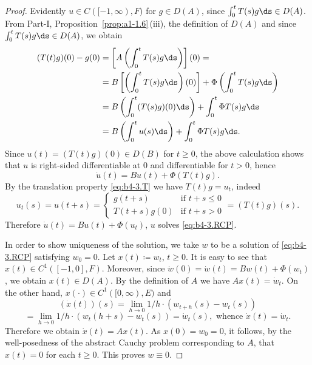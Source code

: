 \begin{proof} Evidently $u \in C([-1,\infty),F)$ for $g \in D(A)$,
since $\int_{0}^{t} T(s)g \ds  \in D(A)$.
From Part-I, Proposition~\ref{prop:a1-1.6}\,(iii), the definition of\/ $D(A)$ and since $\int_{0}^{t} T(s)g \ds  \in D(A)$, we obtain
\begin{align*}
	(T(t)g)(0) - g(0) &= \left[A\left(\int_{0}^{t} T(s)g  \ds \right)\right](0) = \\
	&= B\left[\left(\int_{0}^{t} T(s)g \ds\right)(0)\right] + \Phi\left(\int_{0}^{t} T(s)g \ds \right) \\
	&= B\left(\int_{0}^{t} (T(s)g)(0) \ds\right) + \int_{0}^{t} \Phi T(s)g \ds  \\
	&= B\left(\int_{0}^{t} u(s) \ds\right)  + \int_{0}^{t} \Phi T(s)g \ds .
\end{align*}
Since $u(t) = (T(t)g)(0) \in D(B)$ for $t \geq 0$, the above calculation shows that $u$ is right-sided differentiable at $0$ and differentiable for $t > 0$, hence
\[
\dot{u}(t) = Bu(t) + \Phi(T(t)g) .
\]
By the translation property \eqref{eq:b4-3.T} we have $T(t)g = u_t$, indeed
\[
u_t(s) = u(t+s) = 
\begin{cases}
	g(t+s) & \text{if } t+s \leq 0 \\
	T(t+s)g(0) & \text{if } t+s > 0
\end{cases}
= (T(t)g)(s) .
\]
Therefore $\dot{u}(t) = Bu(t) + \Phi(u_t)$, \ie $u$ solves \eqref{eq:b4-3.RCP}.

In order to show uniqueness of the solution, we take $w$ to be a solution of  \eqref{eq:b4-3.RCP} satisfying $w_{0} = 0$. 
Let $x(t) \coloneq  w_t$, $t \geq 0$. 
It is easy to see that $x(t) \in C^1([-1,0],F)$. Moreover, since $\dot{w}(0) = \dot{w}(t) = Bw(t) + \Phi(w_t)$, we obtain $x(t) \in D(A)$. 
By the definition of\/ $A$ we have $Ax(t) = \dot{w}_t$. 
On the other hand, $x(\cdot) \in C^1([0,\infty),E)$ and
\[
(\dot{x}(t))(s) = \lim_{h \to 0} 1/h \cdot (w_{t+h}(s) - w_t(s))
\]
\[
= \lim_{h \to 0} 1/h \cdot (w_t(h+s) - w_t(s)) = \dot{w}_t(s), \text{ whence } \dot{x}(t) = \dot{w}_t .
\]
Therefore we obtain $\dot{x}(t) = Ax(t)$. 
As $x(0) = w_{0} = 0$, it follows, by the well-posedness of the abstract Cauchy problem corresponding to $A$,  that $x(t) = 0$ for each $t \geq 0$. 
This proves $w \equiv 0$.
\end{proof}

